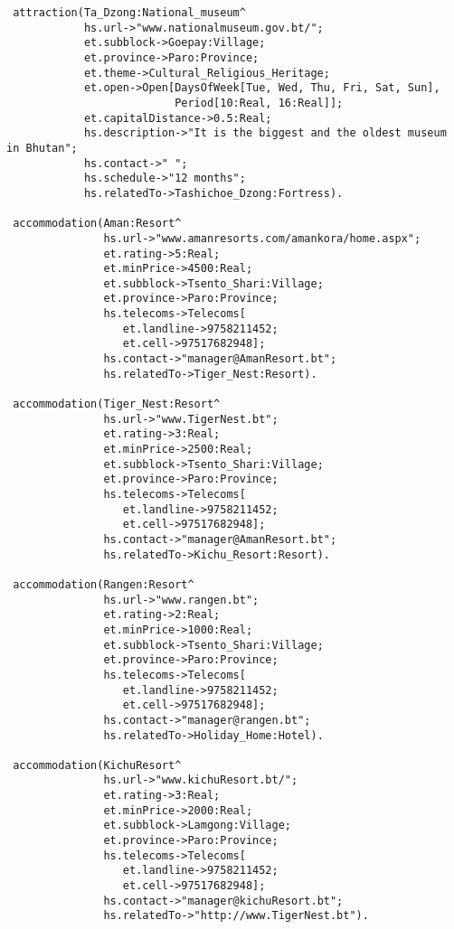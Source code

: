 \begin{verbatim}
 attraction(Ta_Dzong:National_museum^
            hs.url->"www.nationalmuseum.gov.bt/";
            et.subblock->Goepay:Village;
            et.province->Paro:Province;
            et.theme->Cultural_Religious_Heritage;
            et.open->Open[DaysOfWeek[Tue, Wed, Thu, Fri, Sat, Sun],
                          Period[10:Real, 16:Real]];
            et.capitalDistance->0.5:Real;
            hs.description->"It is the biggest and the oldest museum in Bhutan";
            hs.contact->" ";
            hs.schedule->"12 months";
            hs.relatedTo->Tashichoe_Dzong:Fortress).

 accommodation(Aman:Resort^
               hs.url->"www.amanresorts.com/amankora/home.aspx";
               et.rating->5:Real;
               et.minPrice->4500:Real;
               et.subblock->Tsento_Shari:Village;
               et.province->Paro:Province;
               hs.telecoms->Telecoms[
                  et.landline->9758211452;
                  et.cell->97517682948];
               hs.contact->"manager@AmanResort.bt";
               hs.relatedTo->Tiger_Nest:Resort).   

 accommodation(Tiger_Nest:Resort^
               hs.url->"www.TigerNest.bt";
               et.rating->3:Real;
               et.minPrice->2500:Real;
               et.subblock->Tsento_Shari:Village;
               et.province->Paro:Province;
               hs.telecoms->Telecoms[
                  et.landline->9758211452;
                  et.cell->97517682948];
               hs.contact->"manager@AmanResort.bt";
               hs.relatedTo->Kichu_Resort:Resort).   

 accommodation(Rangen:Resort^
               hs.url->"www.rangen.bt";
               et.rating->2:Real;
               et.minPrice->1000:Real;
               et.subblock->Tsento_Shari:Village;
               et.province->Paro:Province;
               hs.telecoms->Telecoms[
                  et.landline->9758211452;
                  et.cell->97517682948];
               hs.contact->"manager@rangen.bt";
               hs.relatedTo->Holiday_Home:Hotel).                      

 accommodation(KichuResort^
               hs.url->"www.kichuResort.bt/";
               et.rating->3:Real;
               et.minPrice->2000:Real;
               et.subblock->Lamgong:Village;
               et.province->Paro:Province;
               hs.telecoms->Telecoms[
                  et.landline->9758211452;
                  et.cell->97517682948];
               hs.contact->"manager@kichuResort.bt";
               hs.relatedTo->"http://www.TigerNest.bt").   
                  

\end{verbatim}
